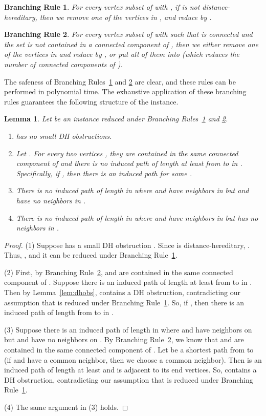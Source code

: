\documentclass[11pt]{elsarticle}
\newtheorem{lemma}[theorem]{Lemma}
\newtheorem{BRULE}{Branching Rule}
\begin{document}
\begin{BRULE}\label{brule:threevertices}
For every vertex subset  of  with , 
if   is not distance-hereditary, then we remove one of the vertices in , and reduce  by .
\end{BRULE}
\begin{BRULE}\label{brule:reducecomponent}
For every vertex subset  of  with  such that  is connected and the set  is not contained in a connected component of , 
then we either remove one of the vertices in  and reduce  by , or put all of them into  (which reduces the number of connected components of ).
\end{BRULE}

The safeness of Branching Rules~\ref{brule:threevertices} and \ref{brule:reducecomponent} are clear, and these rules can be performed in polynomial time.
The exhaustive application of these branching rules guarantees the following structure of the instance.


\begin{lemma}
\label{lem:shortdistance}
Let  be an instance reduced under Branching Rules~\ref{brule:threevertices} and \ref{brule:reducecomponent}.
\begin{enumerate}[(1)]
\item  has no small DH obstructions.
\item Let . For every two vertices , 
they are contained in the same connected component of  and there is no induced path of length at least  from  to  in .
Specifically, if , then there is an induced path  for some .
\item There is no induced path  of length  in  where  and  have neighbors in  but  and  have no neighbors in .
\item There is no induced path  of length  in  where  and  have neighbors in  but  has no neighbors in .
\end{enumerate}
\end{lemma}
\begin{proof}
(1) Suppose  has a small DH obstruction . Since  is distance-hereditary, .
Thus, , and it can be reduced under Branching Rule~\ref{brule:threevertices}.

(2) First, by Branching Rule~\ref{brule:reducecomponent}, 
 and  are contained in the same connected component of .
Suppose there is an induced path of length at least  from  to  in .
Then by Lemma~\ref{lem:dhobs},  contains a DH obstruction, contradicting our assumption that  is reduced under Branching Rule~\ref{brule:threevertices}.
So, if , then there is an induced path of length  from  to  in .

(3) Suppose there is an induced path  of length  in  where  and  have neighbors on  but  and  have no neighbors on .
By Branching Rule~\ref{brule:reducecomponent}, 
we know that  and  are contained in the same connected component of .
Let  be a shortest path from  to  (if  and  have a common neighbor, then we choose a common neighbor).
Then  is an induced path of length at least  and  is adjacent to its end vertices.
So,  contains a DH obstruction, contradicting our assumption that  is reduced under Branching Rule~\ref{brule:threevertices}.

(4) The same argument in (3) holds.
\end{proof}
\end{document}
